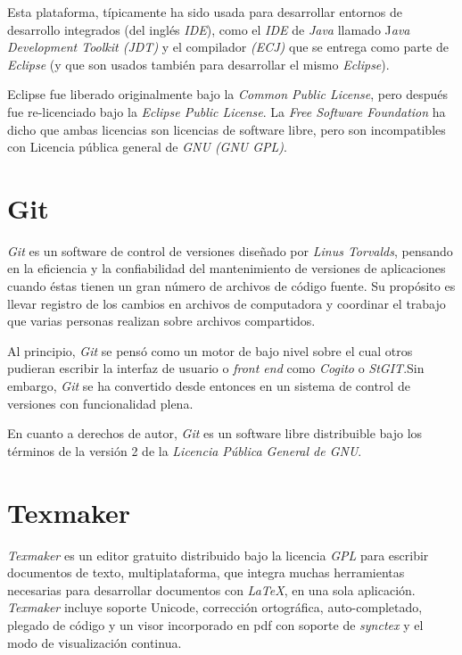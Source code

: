 Esta plataforma, típicamente ha sido usada para desarrollar entornos de desarrollo integrados (del inglés \textit{IDE}), como el \textit{IDE} de \textit{Java} llamado J\textit{ava Development Toolkit (JDT)} y el compilador \textit{(ECJ)} que se entrega como parte de \textit{Eclipse} (y que son usados también para desarrollar el mismo \textit{Eclipse}).

Eclipse fue liberado originalmente bajo la \textit{Common Public License}, pero después fue re-licenciado bajo la \textit{Eclipse Public License}. La \textit{Free Software Foundation} ha dicho que ambas licencias son licencias de software libre, pero son incompatibles con Licencia pública general de \textit{GNU (GNU GPL)}.

\section{Git}
\textit{Git}\cite{wiki:git} es un software de control de versiones diseñado por \textit{Linus Torvalds}, pensando en la eficiencia y la confiabilidad del mantenimiento de versiones de aplicaciones cuando éstas tienen un gran número de archivos de código fuente. Su propósito es llevar registro de los cambios en archivos de computadora y coordinar el trabajo que varias personas realizan sobre archivos compartidos.

Al principio, \textit{Git} se pensó como un motor de bajo nivel sobre el cual otros pudieran escribir la interfaz de usuario o \textit{front end} como \textit{Cogito} o \textit{StGIT}.Sin embargo, \textit{Git} se ha convertido desde entonces en un sistema de control de versiones con funcionalidad plena.

En cuanto a derechos de autor, \textit{Git} es un software libre distribuible bajo los términos de la versión 2 de la \textit{Licencia Pública General de GNU}.

\section{Texmaker}
\textit{Texmaker}\cite{wiki:texmaker} es un editor gratuito distribuido bajo la licencia \textit{GPL} para escribir documentos de texto, multiplataforma, que integra muchas herramientas necesarias para desarrollar documentos con \textit{LaTeX}, en una sola aplicación. \textit{Texmaker} incluye soporte Unicode, corrección ortográfica, auto-completado, plegado de código y un visor incorporado en pdf con soporte de \textit{synctex} y el modo de visualización continua.

